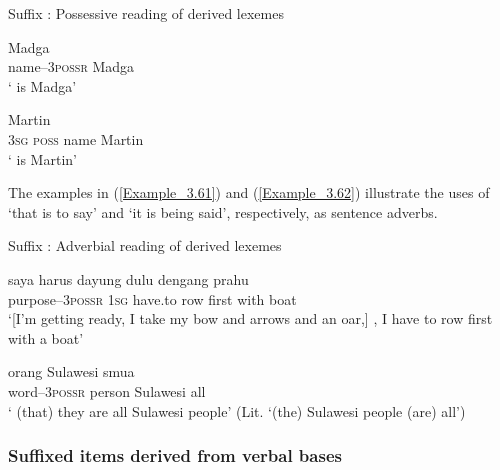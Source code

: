 \begin{styleExampleTitle}
{Suffix : Possessive reading of derived lexemes}
\end{styleExampleTitle}
\ea
\label{Example_3.59}
 {Madga}\\ %
 name–\textsc{3possr}  Madga\\
\glt 
‘ is Madga’ \textstyleExampleSource{[081011-005-Cv.0027]}
\z

\ea
\label{Example_3.60}
 {} {} {Martin}\\ %
 \textsc{3sg}  \textsc{poss}  name  Martin\\
\glt 
‘ is Martin’ \textstyleExampleSource{[081011-022-Cv.0241]}
\z


The examples in (\ref{Example_3.61}) and (\ref{Example_3.62}) illustrate the uses of  ‘that is to say’ and  ‘it is being said’, respectively, as sentence adverbs.



\begin{styleExampleTitle}
Suffix : Adverbial reading of derived lexemes
\end{styleExampleTitle}

\ea
\label{Example_3.61}
\gll {\ldots} {} {saya} {harus} {dayung} {dulu} {dengang} {prahu}\\ %
  {}   purpose–\textsc{3possr}  \textsc{1sg}  have.to  row  first  with  boat\\
\glt 
‘[I’m getting ready, I take my bow and arrows and an oar,] , I have to row first with a boat’ \textstyleExampleSource{[080919-004-NP.0008]}
\z

\ea
\label{Example_3.62}
 {orang} {Sulawesi} {smua}\\ %
 word–\textsc{3possr}  person  Sulawesi  all\\

\glt
‘ (that) they are all Sulawesi people’ (Lit. ‘(the) Sulawesi people (are) all’) \textstyleExampleSource{[081029-005-Cv.0106]}
\z

\subsubsection[Suffixed items derived from verbal bases]{Suffixed items derived from verbal bases}\label{Para_3.1.6.2}

